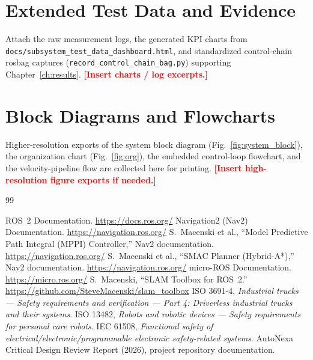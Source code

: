 \documentclass[12pt,a4paper]{report}
\newcommand{\TODO}[1]{\textcolor{red}{\textbf{[#1]}}}
\begin{document}
\begin{appendices}

\chapter{Extended Test Data and Evidence}
\label{app:testdata}

Attach the raw measurement logs, the generated KPI charts from
\texttt{docs/subsystem\_test\_data\_dashboard.html}, and standardized control-chain
rosbag captures (\texttt{record\_control\_chain\_bag.py}) supporting
Chapter~\ref{ch:results}. \TODO{Insert charts / log excerpts.}

\chapter{Block Diagrams and Flowcharts}
\label{app:diagrams}

Higher-resolution exports of the system block diagram (Fig.~\ref{fig:system_block}),
the organization chart (Fig.~\ref{fig:org}), the embedded control-loop flowchart,
and the velocity-pipeline flow are collected here for printing. \TODO{Insert
high-resolution figure exports if needed.}

\end{appendices}

\begin{thebibliography}{99}

 ROS~2 Documentation. \url{https://docs.ros.org/}
 Navigation2 (Nav2) Documentation. \url{https://navigation.ros.org/}
 S.~Macenski et al., ``Model Predictive Path Integral (MPPI) Controller,'' Nav2 documentation. \url{https://navigation.ros.org/}
 S.~Macenski et al., ``SMAC Planner (Hybrid-A*),'' Nav2 documentation. \url{https://navigation.ros.org/}
 micro-ROS Documentation. \url{https://micro.ros.org/}
 S.~Macenski, ``SLAM Toolbox for ROS~2.'' \url{https://github.com/SteveMacenski/slam_toolbox}
 ISO 3691-4, \textit{Industrial trucks --- Safety requirements and verification --- Part 4: Driverless industrial trucks and their systems}.
 ISO 13482, \textit{Robots and robotic devices --- Safety requirements for personal care robots}.
 IEC 61508, \textit{Functional safety of electrical/electronic/programmable electronic safety-related systems}.
 AutoNexa Critical Design Review Report (2026), project repository documentation.

\end{thebibliography}
\end{document}
